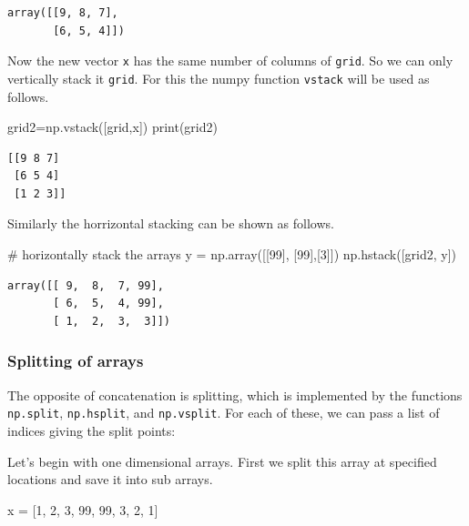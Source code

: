 \documentclass[
  letterpaper,
  DIV=11,
  numbers=noendperiod]{scrreprt}
\newenvironment{Shaded}{\begin{snugshade}}{\end{snugshade}}
\newcommand{\BuiltInTok}[1]{\textcolor[rgb]{0.00,0.23,0.31}{#1}}
\newcommand{\CommentTok}[1]{\textcolor[rgb]{0.37,0.37,0.37}{#1}}
\newcommand{\DecValTok}[1]{\textcolor[rgb]{0.68,0.00,0.00}{#1}}
\newcommand{\NormalTok}[1]{\textcolor[rgb]{0.00,0.23,0.31}{#1}}
\newcommand{\OperatorTok}[1]{\textcolor[rgb]{0.37,0.37,0.37}{#1}}
\theoremstyle{plain}
\theoremstyle{definition}
\theoremstyle{remark}
\begin{document}
\begin{verbatim}
array([[9, 8, 7],
       [6, 5, 4]])
\end{verbatim}

Now the new vector \texttt{x} has the same number of columns of
\texttt{grid}. So we can only vertically stack it \texttt{grid}. For
this the numpy function \texttt{vstack} will be used as follows.

\begin{Shaded}
\begin{Highlighting}[]
\NormalTok{grid2}\OperatorTok{=}\NormalTok{np.vstack([grid,x])}
\BuiltInTok{print}\NormalTok{(grid2)}
\end{Highlighting}
\end{Shaded}

\begin{verbatim}
[[9 8 7]
 [6 5 4]
 [1 2 3]]
\end{verbatim}

Similarly the horrizontal stacking can be shown as follows.

\begin{Shaded}
\begin{Highlighting}[]
\CommentTok{\# horizontally stack the arrays}
\NormalTok{y }\OperatorTok{=}\NormalTok{ np.array([[}\DecValTok{99}\NormalTok{],}
\NormalTok{              [}\DecValTok{99}\NormalTok{],[}\DecValTok{3}\NormalTok{]])}
\NormalTok{np.hstack([grid2, y])}
\end{Highlighting}
\end{Shaded}

\begin{verbatim}
array([[ 9,  8,  7, 99],
       [ 6,  5,  4, 99],
       [ 1,  2,  3,  3]])
\end{verbatim}

\subsubsection{Splitting of arrays}\label{splitting-of-arrays}

The opposite of concatenation is splitting, which is implemented by the
functions \texttt{np.split}, \texttt{np.hsplit}, and \texttt{np.vsplit}.
For each of these, we can pass a list of indices giving the split
points:

Let's begin with one dimensional arrays. First we split this array at
specified locations and save it into sub arrays.

\begin{Shaded}
\begin{Highlighting}[]
\NormalTok{x }\OperatorTok{=}\NormalTok{ [}\DecValTok{1}\NormalTok{, }\DecValTok{2}\NormalTok{, }\DecValTok{3}\NormalTok{, }\DecValTok{99}\NormalTok{, }\DecValTok{99}\NormalTok{, }\DecValTok{3}\NormalTok{, }\DecValTok{2}\NormalTok{, }\DecValTok{1}\NormalTok{]}
\end{Highlighting}
\end{Shaded}
\end{document}
